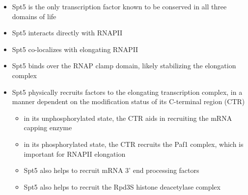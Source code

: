 \documentclass[10pt, letterpaper]{article}
\begin{document}
\begin{itemize}[nosep, topsep=.5em]
\item Spt5 is the only transcription factor known to be conserved in all three domains of life
\item Spt5 interacts directly with RNAPII
\item Spt5 co-localizes with elongating RNAPII
\item Spt5 binds over the RNAP clamp domain, likely stabilizing the elongation complex
\item Spt5 physically recruits factors to the elongating transcription complex, in a manner dependent on the modification status of its C-terminal region (CTR)
    \begin{itemize}[nosep]
        \item in its unphosphorylated state, the CTR aids in recruiting the mRNA capping enzyme
        \item in its phosphorylated state, the CTR recruits the Paf1 complex, which is important for RNAPII elongation
        \item Spt5 also helps to recruit mRNA 3' end processing factors
        \item Spt5 also helps to recruit the Rpd3S histone deacetylase complex
    \end{itemize}
\end{itemize}

{}

\end{document}

